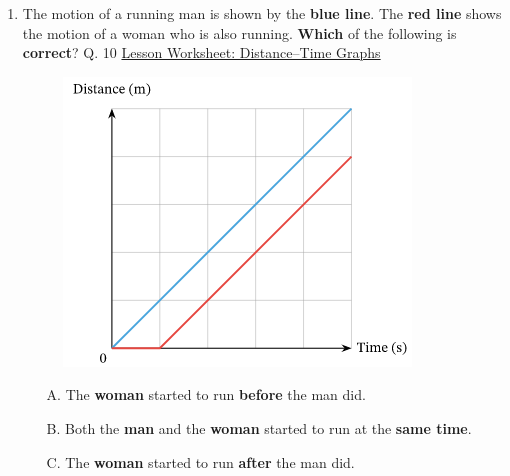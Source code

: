 \documentclass[A4,12pt]{article}
\begin{document}
\begin{enumerate}[label=\bfseries (\arabic*)]
\item The motion of a running man is shown by the \textbf{blue line}. The \textbf{red line} shows the motion of a woman who is also running. \textbf{Which} of the following is \textbf{correct}? \cite{Nagwa} Q. 10 \href{https://www.nagwa.com/en/worksheets/964158724874/}{Lesson Worksheet: Distance–Time Graphs}
%
\begin{figure}[H]
    \centering
    \includegraphics[scale=0.7]{Nagwa_Q10_kin.png}
    \caption{}
    \label{fig:my_label}
\end{figure}
%
\begin{itemize}
    \item[A.] The \textbf{woman} started to run \textbf{before} the man did.
    \item[B.] Both the \textbf{man} and the \textbf{woman} started to run at the \textbf{same time}.
    \item[C.] The \textbf{woman} started to run \textbf{after} the man did.
\end{itemize}













\end{enumerate}
\end{document}
